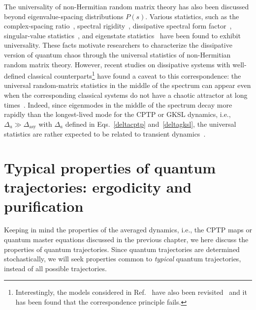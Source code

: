\documentclass[preprint,pteplogo]{ptephy_v2}%
\numberwithin{equation}{section}
\theoremstyle{definition}
\begin{document}
The universality of non-Hermitian random matrix theory has also been discussed beyond eigenvalue-spacing distributions $P(s)$.
Various statistics, such as the complex-spacing ratio~\cite{jaiswal2019universality, sa2020complex}, spectral rigidity~\cite{huang2020spectral}, dissipative spectral form factor~\cite{li2021spectral}, singular-value statistics~\cite{kawabata2023singular, roccati2024diagnosing, nandy2025probing}, and eigenstate statistics~\cite{hamazaki2022lindbladian, cipolloni2023entanglement, ghosh2023eigenvector, cipolloni2024non, singha2025unveiling, almeida2025universality, ferrari2025chaos} have been found to exhibit universality.
These facts motivate researchers to characterize the dissipative version of quantum chaos through the universal statistics of non-Hermitian random matrix theory.
However, recent studies on dissipative systems with well-defined classical counterparts\footnote{
Interestingly, the models considered in Ref.~\cite{grobe1988quantum} have also been revisited~\cite{xhwm-jpdf} and it has been found that the correspondence principle fails.
} have found a caveat to this correspondence: the universal random-matrix statistics in the middle of the spectrum can appear even when the corresponding classical systems do not have a chaotic attractor at long times~\cite{villasenor2024breakdown,xhwm-jpdf}.
Indeed, since eigenmodes in the middle of the spectrum decay more rapidly than the longest-lived mode for the CPTP or GKSL dynamics, i.e., $\Delta_a\gg  \Delta_\mathrm{asy}$ with $\Delta_a$ defined in Eqs.~\eqref{deltacptp} and~\eqref{deltagksl}, the universal statistics are rather expected to be related to transient dynamics~\cite{hamazaki2022lindbladian, ferrari2023steady, mondal2025transient}.


\section{Typical properties of quantum trajectories: ergodicity and purification}
\label{sec:linear-quantity_purification}
Keeping in mind the properties of the averaged dynamics, i.e., the CPTP maps or quantum master equations discussed in the previous chapter, we here discuss the properties of quantum trajectories.
Since quantum trajectories are determined stochastically, we will seek properties common to \textit{typical} quantum trajectories, instead of all possible trajectories.
\end{document}
